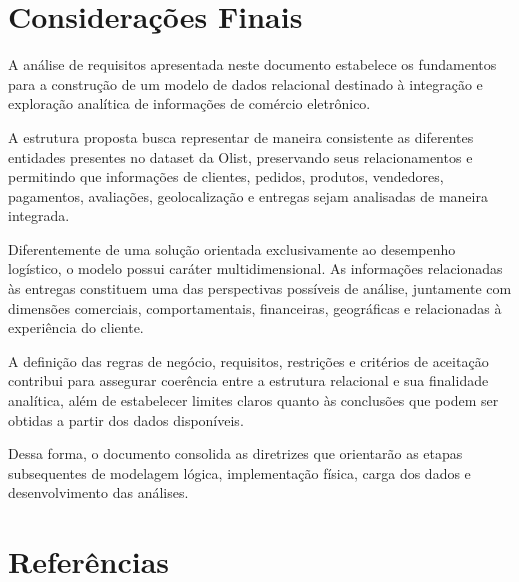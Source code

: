 \documentclass[12pt,a4paper]{article}
\begin{document}
\section{Considerações Finais}

A análise de requisitos apresentada neste documento estabelece os fundamentos para a construção de um modelo de dados relacional destinado à integração e exploração analítica de informações de comércio eletrônico.

A estrutura proposta busca representar de maneira consistente as diferentes entidades presentes no dataset da Olist, preservando seus relacionamentos e permitindo que informações de clientes, pedidos, produtos, vendedores, pagamentos, avaliações, geolocalização e entregas sejam analisadas de maneira integrada.

Diferentemente de uma solução orientada exclusivamente ao desempenho logístico, o modelo possui caráter multidimensional. As informações relacionadas às entregas constituem uma das perspectivas possíveis de análise, juntamente com dimensões comerciais, comportamentais, financeiras, geográficas e relacionadas à experiência do cliente.

A definição das regras de negócio, requisitos, restrições e critérios de aceitação contribui para assegurar coerência entre a estrutura relacional e sua finalidade analítica, além de estabelecer limites claros quanto às conclusões que podem ser obtidas a partir dos dados disponíveis.

Dessa forma, o documento consolida as diretrizes que orientarão as etapas subsequentes de modelagem lógica, implementação física, carga dos dados e desenvolvimento das análises.

\clearpage
\section{Referências}
\end{document}
